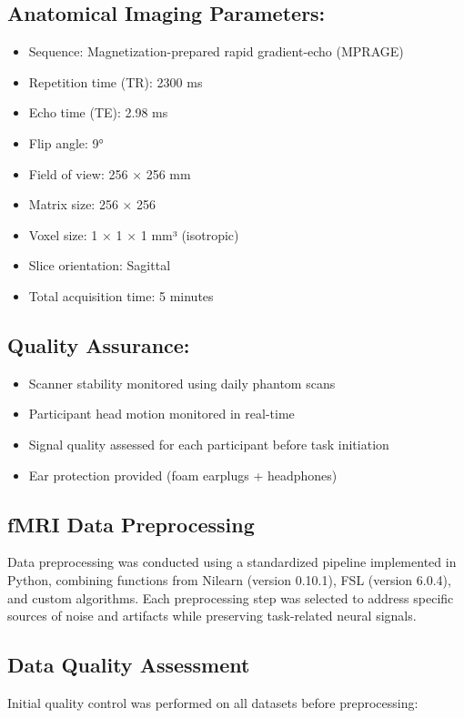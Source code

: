 \documentclass[12pt, a4paper]{article}
\begin{document}
\subsection*{Anatomical Imaging Parameters:}
\begin{itemize}
\item Sequence: Magnetization-prepared rapid gradient-echo (MPRAGE)
\item Repetition time (TR): 2300 ms
\item Echo time (TE): 2.98 ms
\item Flip angle: 9°
\item Field of view: 256 × 256 mm
\item Matrix size: 256 × 256
\item Voxel size: 1 × 1 × 1 mm³ (isotropic)
\item Slice orientation: Sagittal
\item Total acquisition time: 5 minutes
\end{itemize}


\subsection*{Quality Assurance:}
\begin{itemize}
\item Scanner stability monitored using daily phantom scans
\item Participant head motion monitored in real-time
\item Signal quality assessed for each participant before task initiation
\item Ear protection provided (foam earplugs + headphones)
\end{itemize}








\subsection{fMRI Data Preprocessing}
Data preprocessing was conducted using a standardized pipeline implemented in Python, combining functions from Nilearn (version 0.10.1), FSL (version 6.0.4), and custom algorithms. Each preprocessing step was selected to address specific sources of noise and artifacts while preserving task-related neural signals.

\subsection{Data Quality Assessment}
Initial quality control was performed on all datasets before preprocessing:
\end{document}
